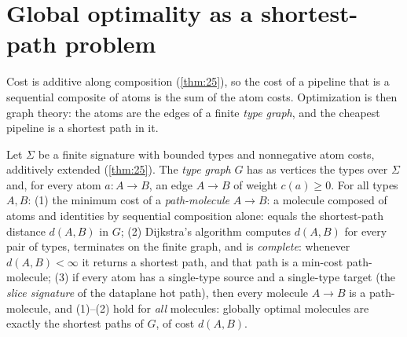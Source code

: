 \section{Global optimality as a shortest-path problem}\label{sec:enrich-shortest}

Cost is additive along composition (\autoref{thm:25}), so the cost of a pipeline that is a
sequential composite of atoms is the sum of the atom costs. Optimization is
then graph theory: the atoms are the edges of a finite \emph{type graph}, and
the cheapest pipeline is a shortest path in it.

\begin{theorem}\label{thm:26}
 Let $\Sigma$ be a finite signature with bounded types and
nonnegative atom costs, additively extended (\autoref{thm:25}). The \emph{type graph} $G$
has as vertices the types over $\Sigma$ and, for every atom
$a \colon A \to B$, an edge $A \to B$ of weight $c (a) \ge 0$. For all types
$A, B$:
(1) the minimum cost of a \emph{path-molecule} $A \to B$: a molecule
composed of atoms and identities by sequential composition alone: equals
the shortest-path distance $d (A,B)$ in $G$;
(2) Dijkstra's algorithm computes $d (A,B)$ for every pair of types, terminates
on the finite graph, and is \emph{complete}: whenever $d (A,B) < \infty$ it
returns a shortest path, and that path is a min-cost path-molecule;
(3) if every atom has a single-type source and a single-type target (the
\emph{slice signature} of the dataplane hot path), then every molecule
$A \to B$ is a path-molecule, and (1)--(2) hold for \emph{all} molecules:
globally optimal molecules are exactly the shortest paths of $G$, of cost
$d (A,B)$.
\end{theorem}

